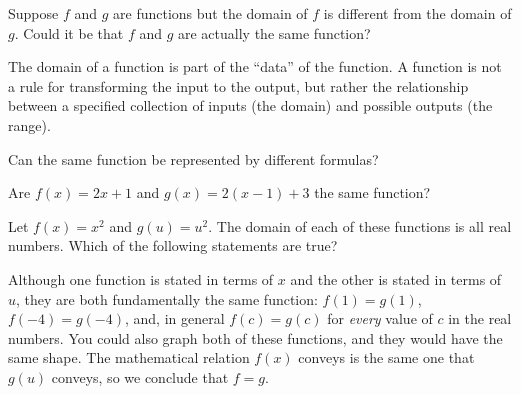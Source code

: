 \documentclass{ximera}
\begin{document}
\begin{problem}
  Suppose $f$ and $g$ are functions but the domain of $f$ is different
  from the domain of $g$.  Could it be that $f$ and $g$ are actually
  the same function?

  \begin{multipleChoice}
  \end{multipleChoice}

  \begin{feedback}
    The domain of a function is part of the ``data'' of the function.
    A function is not a rule for transforming the input to the output,
    but rather the relationship between a specified collection of
    inputs (the domain) and possible outputs (the range).
  \end{feedback}
\end{problem}


\begin{problem}
  Can the same function be represented by different formulas?

  \begin{multipleChoice}
  \end{multipleChoice}

  \begin{problem}
    Are $f(x) = 2x+1$ and $g(x) = 2(x-1)+3$ the same function?

    \begin{multipleChoice}
    \end{multipleChoice}
  \end{problem}
\end{problem} 

\begin{problem}
	Let $f(x) =x^2$ and $g(u) = u^2$.  The domain of each of these functions is all real numbers.  Which of the following statements are true?
	\begin{multipleChoice}
	\end{multipleChoice}
    
    \begin{feedback}[correct]
    Although one function is stated in terms of $x$ and the other is stated in terms of $u$, they are both fundamentally the same function: $f(1) = g(1)$, $f(-4) = g(-4)$, and, in general $f(c) = g(c)$ for \textit{every} value of $c$ in the real numbers.  You could also graph both of these functions, and they would have the same shape.  The mathematical relation $f(x)$ conveys is the same one that $g(u)$ conveys, so we conclude that $f = g$.  
    \end{feedback}
\end{problem}



%
\end{document}
